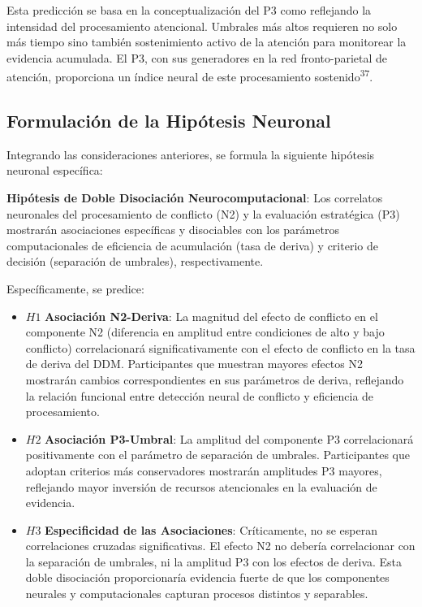 \documentclass[
  spanish,
  10pt,
]{article}
\begin{document}
Esta predicción se basa en la conceptualización del P3 como reflejando
la intensidad del procesamiento atencional. Umbrales más altos requieren
no solo más tiempo sino también sostenimiento activo de la atención para
monitorear la evidencia acumulada. El P3, con sus generadores en la red
fronto-parietal de atención, proporciona un índice neural de este
procesamiento sostenido\textsuperscript{37}.

\subsection{Formulación de la Hipótesis
Neuronal}\label{formulaciuxf3n-de-la-hipuxf3tesis-neuronal}

Integrando las consideraciones anteriores, se formula la siguiente
hipótesis neuronal específica:

\textbf{Hipótesis de Doble Disociación Neurocomputacional}: Los
correlatos neuronales del procesamiento de conflicto (N2) y la
evaluación estratégica (P3) mostrarán asociaciones específicas y
disociables con los parámetros computacionales de eficiencia de
acumulación (tasa de deriva) y criterio de decisión (separación de
umbrales), respectivamente.

Específicamente, se predice:

\begin{itemize}
\item
  \(H1\) \textbf{Asociación N2-Deriva}: La magnitud del efecto de
  conflicto en el componente N2 (diferencia en amplitud entre
  condiciones de alto y bajo conflicto) correlacionará
  significativamente con el efecto de conflicto en la tasa de deriva del
  DDM. Participantes que muestran mayores efectos N2 mostrarán cambios
  correspondientes en sus parámetros de deriva, reflejando la relación
  funcional entre detección neural de conflicto y eficiencia de
  procesamiento.
\item
  \(H2\) \textbf{Asociación P3-Umbral}: La amplitud del componente P3
  correlacionará positivamente con el parámetro de separación de
  umbrales. Participantes que adoptan criterios más conservadores
  mostrarán amplitudes P3 mayores, reflejando mayor inversión de
  recursos atencionales en la evaluación de evidencia.
\item
  \(H3\) \textbf{Especificidad de las Asociaciones}: Críticamente, no se
  esperan correlaciones cruzadas significativas. El efecto N2 no debería
  correlacionar con la separación de umbrales, ni la amplitud P3 con los
  efectos de deriva. Esta doble disociación proporcionaría evidencia
  fuerte de que los componentes neurales y computacionales capturan
  procesos distintos y separables.
\end{itemize}
\end{document}
